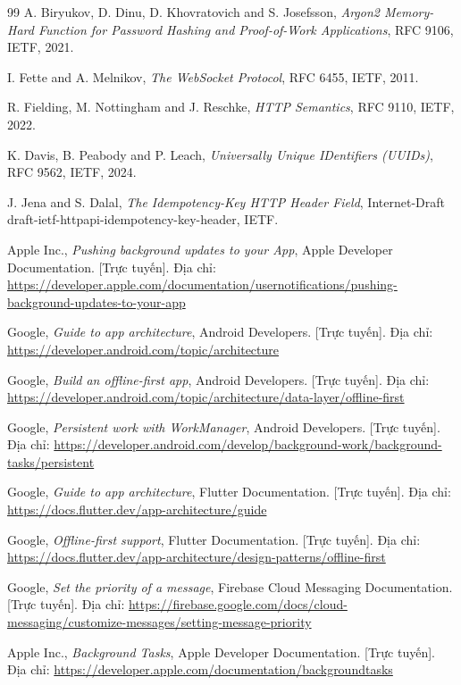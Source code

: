 \begin{thebibliography}{99}
A. Biryukov, D. Dinu, D. Khovratovich and S. Josefsson, \emph{Argon2 Memory-Hard Function for Password Hashing and Proof-of-Work Applications}, RFC 9106, IETF, 2021.

I. Fette and A. Melnikov, \emph{The WebSocket Protocol}, RFC 6455, IETF, 2011.

R. Fielding, M. Nottingham and J. Reschke, \emph{HTTP Semantics}, RFC 9110, IETF, 2022.

K. Davis, B. Peabody and P. Leach, \emph{Universally Unique IDentifiers (UUIDs)}, RFC 9562, IETF, 2024.

J. Jena and S. Dalal, \emph{The Idempotency-Key HTTP Header Field}, Internet-Draft draft-ietf-httpapi-idempotency-key-header, IETF.

Apple Inc., \emph{Pushing background updates to your App}, Apple Developer Documentation. [Trực tuyến]. Địa chỉ: \url{https://developer.apple.com/documentation/usernotifications/pushing-background-updates-to-your-app}

Google, \emph{Guide to app architecture}, Android Developers. [Trực tuyến]. Địa chỉ: \url{https://developer.android.com/topic/architecture}

Google, \emph{Build an offline-first app}, Android Developers. [Trực tuyến]. Địa chỉ: \url{https://developer.android.com/topic/architecture/data-layer/offline-first}

Google, \emph{Persistent work with WorkManager}, Android Developers. [Trực tuyến]. Địa chỉ: \url{https://developer.android.com/develop/background-work/background-tasks/persistent}

Google, \emph{Guide to app architecture}, Flutter Documentation. [Trực tuyến]. Địa chỉ: \url{https://docs.flutter.dev/app-architecture/guide}

Google, \emph{Offline-first support}, Flutter Documentation. [Trực tuyến]. Địa chỉ: \url{https://docs.flutter.dev/app-architecture/design-patterns/offline-first}

Google, \emph{Set the priority of a message}, Firebase Cloud Messaging Documentation. [Trực tuyến]. Địa chỉ: \url{https://firebase.google.com/docs/cloud-messaging/customize-messages/setting-message-priority}

Apple Inc., \emph{Background Tasks}, Apple Developer Documentation. [Trực tuyến]. Địa chỉ: \url{https://developer.apple.com/documentation/backgroundtasks}


\end{thebibliography}
